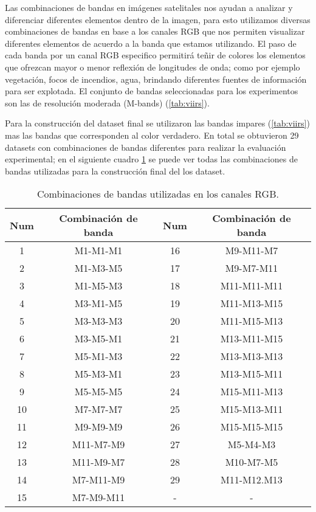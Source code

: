 Las combinaciones de bandas en imágenes satelitales nos ayudan a analizar y diferenciar diferentes elementos dentro de la imagen, para esto utilizamos diversas combinaciones de bandas en base a los canales RGB que nos permiten visualizar diferentes elementos de acuerdo a la banda que estamos utilizando. El paso de cada banda por un canal RGB especifico permitirá teñir de colores los elementos que ofrezcan mayor o menor reflexión de longitudes de onda; como por ejemplo vegetación, focos de incendios, agua, brindando diferentes fuentes de información para ser explotada. El conjunto de bandas seleccionadas para los experimentos son las de resolución moderada (M-bands) (\ref{tab:viirs}).
 
Para la construcción del dataset final se utilizaron las bandas impares (\ref{tab:viirs})  mas las bandas que corresponden al color verdadero. En total se obtuvieron 29 datasets con combinaciones de bandas diferentes para realizar la evaluación experimental; en el siguiente cuadro  \ref{tab:combinacion_banda} se puede ver todas las combinaciones de bandas utilizadas para la construcción final del los dataset.

\begin{table}[h] \begin{center}
\begin{tabular}{|c|c||c|c|}\hline 
\textbf{Num} & \textbf{Combinación de banda} & \textbf{Num} & \textbf{Combinación de banda} \\ \hline 
1  	& 	M1-M1-M1 			& 16  & 	M9-M11-M7  \\ \hline
2  	&   M1-M3-M5			& 17  & 	M9-M7-M11\\  \hline
3  	& 	M1-M5-M3			& 18  & 	M11-M11-M11\\ \hline
4  	&   M3-M1-M5 			& 19  & 	M11-M13-M15\\ \hline
5   & 	M3-M3-M3 			& 20  & 	M11-M15-M13\\ \hline
6   & 	M3-M5-M1 			& 21  & 	M13-M11-M15 \\ \hline
7   & 	M5-M1-M3 			& 22  & 	M13-M13-M13\\ \hline
8   & 	M5-M3-M1 			& 23  & 	M13-M15-M11\\ \hline
9   &   M5-M5-M5  			& 24  & 	M15-M11-M13\\ \hline
10  &	M7-M7-M7   			& 25  & 	M15-M13-M11\\ \hline
11  & 	M9-M9-M9   			& 26  & 	M15-M15-M15\\ \hline
12  & 	M11-M7-M9  			& 27  & 	M5-M4-M3\\ \hline
13  & 	M11-M9-M7  			& 28  & 	M10-M7-M5\\ \hline
14  &  	M7-M11-M9  			& 29  & 	M11-M12.M13\\ \hline
15  & 	M7-M9-M11  			& -& -\\ \hline      	
\end{tabular}
\end{center}\caption{Combinaciones de bandas utilizadas en los canales RGB. \label{tab:combinacion_banda}}
\end{table}

